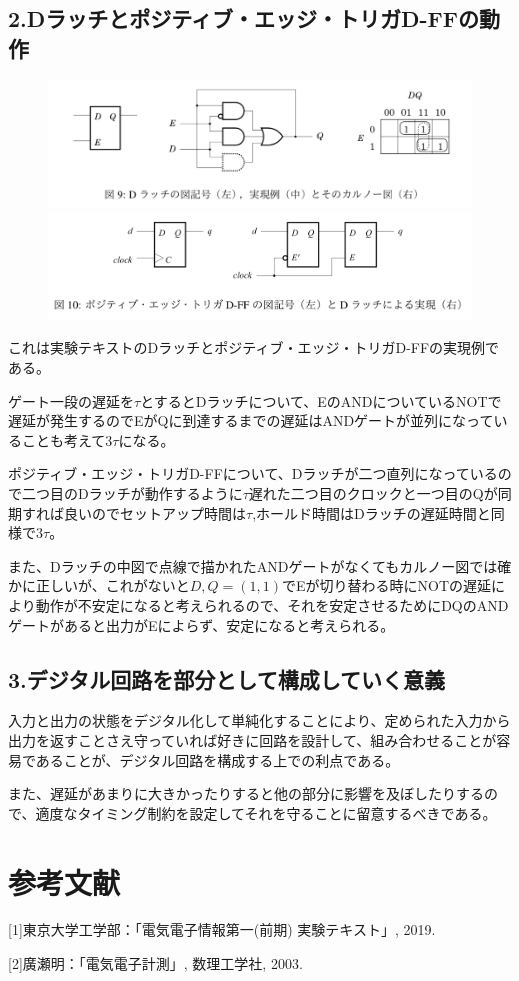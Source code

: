 \documentclass[dvipdfmx]{jsarticle}
\begin{document}
\subsection{2.Dラッチとポジティブ・エッジ・トリガD-FFの動作}
\begin{figure}[h]
\includegraphics[scale = 0.3]{IMG_0053.jpg}

\includegraphics[scale = 0.2]{IMG_0054.jpg}
\end{figure}


これは実験テキストのDラッチとポジティブ・エッジ・トリガD-FFの実現例である。

ゲート一段の遅延を$\tau$とするとDラッチについて、EのANDについているNOTで遅延が発生するのでEがQに到達するまでの遅延はANDゲートが並列になっていることも考えて$3\tau$になる。


ポジティブ・エッジ・トリガD-FFについて、Dラッチが二つ直列になっているので二つ目のDラッチが動作するように$\tau$遅れた二つ目のクロックと一つ目のQが同期すれば良いのでセットアップ時間は$\tau$,ホールド時間はDラッチの遅延時間と同様で$3\tau$。

また、Dラッチの中図で点線で描かれたANDゲートがなくてもカルノー図では確かに正しいが、これがないと$D, Q = (1, 1)$でEが切り替わる時にNOTの遅延により動作が不安定になると考えられるので、それを安定させるためにDQのANDゲートがあると出力がEによらず、安定になると考えられる。



\subsection{3.デジタル回路を部分として構成していく意義}

入力と出力の状態をデジタル化して単純化することにより、定められた入力から出力を返すことさえ守っていれば好きに回路を設計して、組み合わせることが容易であることが、デジタル回路を構成する上での利点である。

また、遅延があまりに大きかったりすると他の部分に影響を及ぼしたりするので、適度なタイミング制約を設定してそれを守ることに留意するべきである。



\section{参考文献}
[1]東京大学工学部：「電気電子情報第一(前期) 実験テキスト」, 2019.

[2]廣瀬明：「電気電子計測」, 数理工学社, 2003.
\end{document}
